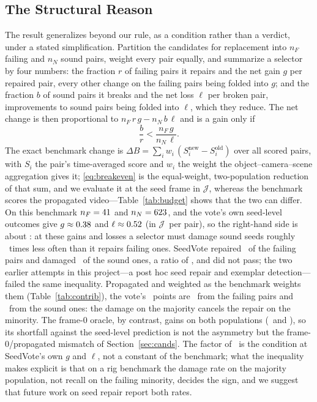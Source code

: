 \documentclass[journal]{IEEEtran}
\newcommand{\Jscore}{\ensuremath{\mathcal{J}}}
\begin{document}
\subsection{The Structural Reason}
\label{sec:asymmetry}
The result generalizes beyond our rule, as a condition rather than a verdict,
under a stated simplification. Partition the candidates for replacement into
$n_F$ failing and $n_N$ sound pairs, weight every pair equally, and summarize
a selector by four numbers: the fraction $r$ of failing pairs it repairs and
the net gain $g$ per repaired pair, every other change on the failing pairs
being folded into $g$; and the fraction $b$ of sound pairs it breaks and the
net loss $\ell$ per broken pair, improvements to sound pairs being folded into
$\ell$, which they reduce. The net change is then proportional to
$n_F\,r\,g-n_N\,b\,\ell$ and is a gain only if
\begin{equation}
\label{eq:breakeven}
\frac{b}{r} < \frac{n_F\, g}{n_N\, \ell}.
\end{equation}
The exact benchmark change is
$\Delta B=\sum_i w_i\,(S_i^{\mathrm{new}}-S_i^{\mathrm{old}})$ over all scored
pairs, with $S_i$ the pair's time-averaged score and $w_i$ the weight the
object--camera--scene aggregation gives it; \eqref{eq:breakeven} is the
equal-weight, two-population reduction of that sum, and we evaluate it at the
seed frame in \Jscore, whereas the benchmark scores the propagated
video---Table~\ref{tab:budget} shows that the two can differ. On this
benchmark $n_F=41$ and $n_N=623$, and the vote's own seed-level
outcomes give $g\approx0.38$ and $\ell\approx0.52$ (in
\Jscore\ per pair), so the right-hand side is about \breakEvenRatio: at these
gains and losses a selector must damage sound seeds roughly \breakEvenTimes\
times less often than it repairs failing ones. SeedVote repaired
\voteRepairRate\ of the failing pairs and damaged \voteDamageRate\ of the sound
ones, a ratio of \voteBR, and did not pass; the two earlier attempts in this
project---a post hoc seed repair and exemplar detection---failed the same
inequality. Propagated and weighted as the benchmark weights them
(Table~\ref{tab:contrib}), the vote's \voteReal\ points are \voteFzeroContrib\
from the failing pairs and \voteNzeroContrib\ from the sound ones: the damage
on the majority cancels the repair on the minority. The frame-0 oracle, by
contrast, gains on both populations (\oracleFzeroContrib\ and
\oracleNzeroContrib), so its shortfall against the seed-level prediction is not
the asymmetry but the frame-0/propagated mismatch of Section~\ref{sec:cands}. The factor of \breakEvenTimes\ is the condition at
SeedVote's own $g$ and $\ell$, not a constant of the benchmark; what the
inequality makes explicit is that on a rig benchmark the damage rate on the
majority population, not recall on the failing minority, decides the sign, and
we suggest that future work on seed repair report both rates.
\end{document}
